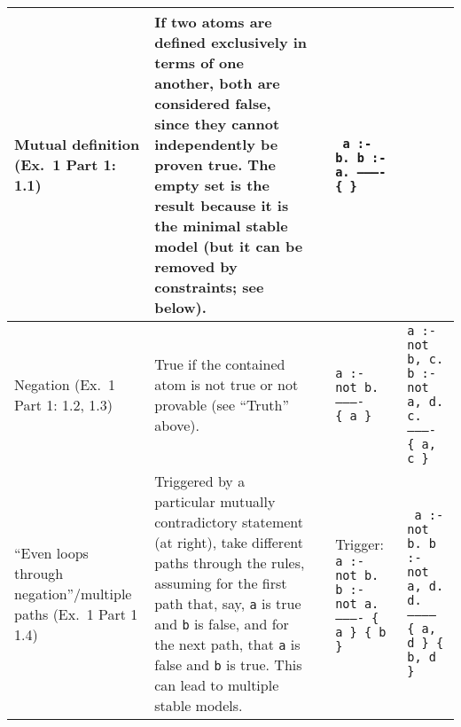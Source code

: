 \documentclass[10pt,a4paper,landscape]{article}
\begin{document}
\begin{longtable}{Lp{13.5cm}lXX}
	Mutual definition \newline (Ex.\ 1 Part 1: 1.1)
		& If two atoms are defined exclusively in terms of one another, both are considered false, since they cannot independently be proven true.
		The empty set is the result because it is the minimal stable model (but it can be removed by constraints; see below).
		&& \texttt{%
			a :- b. \newline
			b :- a. \newline
			---------- \newline				
		 	\{ \} } &\\ \midrule
	
	Negation \newline (Ex.\ 1 Part 1: 1.2, 1.3)
		& True if the contained atom is not true or not provable (see ``Truth'' above).
		&& \texttt{a :- not b. \newline
				  ---------- \newline
			  	  \{ a \} } 
		& \texttt{a :- not b, c. \newline
				b :- not a, d. \newline
				c. \newline
				---------- \newline
				\{ a, c \}} \\ \midrule
		
	``Even loops \newline through negation''\slash \newline multiple paths \newline (Ex.\ 1 Part 1  1.4)
		& Triggered by a particular mutually contradictory statement (at right), take different paths through the rules, assuming for the first path that, say, \texttt{a} is true and \texttt{b} is false, and for the next path, that \texttt{a} is false and \texttt{b} is true.
		This can lead to multiple stable models.

		&& Trigger: \newline
		\texttt{%
			a :- not b. \newline
			b :- not a. \newline
			---------- \newline
			\{ a \} \newline
			\{ b \}}
		& \texttt{%
			a :- not b. \newline
			b :- not a, d. \newline
			d. \newline
			----------- \newline
			\{ a, d \} \newline
			\{ b, d \}} \newline \\ %
		


\end{longtable}
\end{document}

